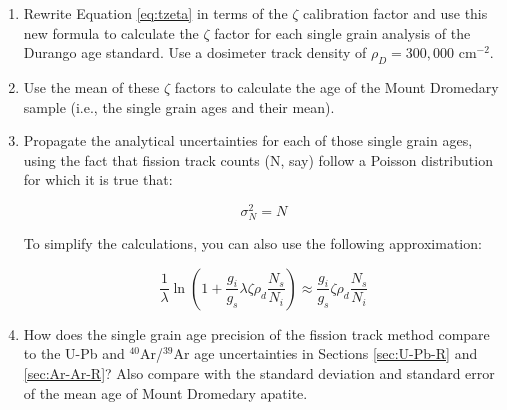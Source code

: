\documentclass{book}
\begin{document}
\begin{enumerate} 

\item Rewrite Equation \ref{eq:tzeta} in terms of the $\zeta$
  calibration factor and use this new formula to calculate the $\zeta$
  factor for each single grain analysis of the Durango age standard.
  Use a dosimeter track density of $\rho_D = 300,000$ cm$^{-2}$.
\item Use the mean of these $\zeta$ factors to calculate the age of
  the Mount Dromedary sample (i.e., the single grain ages and their
  mean).
\item Propagate the analytical uncertainties for each of those single
  grain ages, using the fact that fission track counts (N, say) follow
  a Poisson distribution for which it is true that:

$$\sigma^2_N = N$$

To simplify the calculations, you can also use the following
approximation:

$$\frac{1}{\lambda}\ln\left(1+\frac{g_i}{g_s}\lambda\zeta\rho_d\frac{N_s}{N_i}\right)
\approx \frac{g_i}{g_s}\zeta\rho_d\frac{N_s}{N_i}$$

\item How does the single grain age precision of the fission track
  method compare to the U-Pb and $^{40}$Ar/$^{39}$Ar age uncertainties
  in Sections \ref{sec:U-Pb-R} and \ref{sec:Ar-Ar-R}? Also compare
  with the standard deviation and standard error of the mean age of
  Mount Dromedary apatite.

\end{enumerate}

\newpage\pagestyle{empty}~
\end{document}
